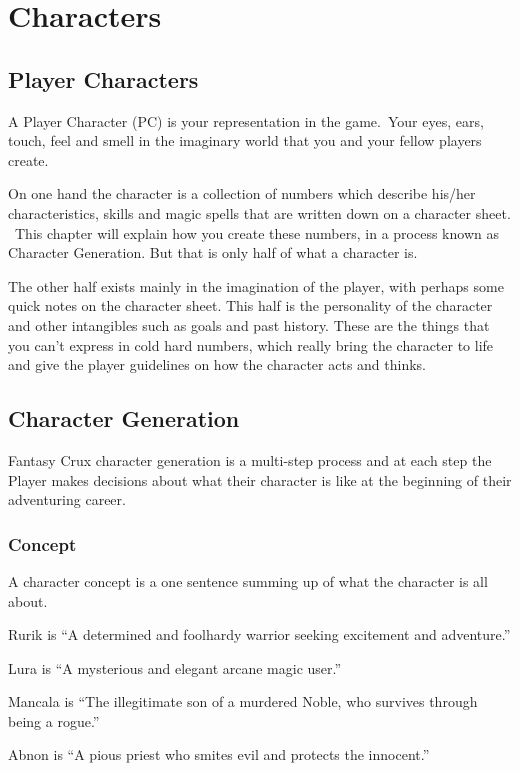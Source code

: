 \chapter{Characters}
\label{ch:characters}

\section{Player Characters}
A Player Character (PC) is your representation in the game. Your eyes, ears, touch, feel and smell in the imaginary world that you and your fellow players create.

On one hand the character is a collection of numbers which describe his/her characteristics, skills and magic spells that are written down on a character sheet.  This chapter will explain how you create these numbers, in a process known as Character Generation. But that is only half of what a character is.

The other half exists mainly in the imagination of the player, with perhaps some quick notes on the character sheet. This half is the personality of the character and other intangibles such as goals and past history. These are the things that you can’t express in cold hard numbers, which really bring the character to life and give the player guidelines on how the character acts and thinks.


\section{Character Generation}
Fantasy Crux character generation is a multi-step process and at each step the Player makes decisions about what their character is like at the beginning of their adventuring career. 

\subsection{Concept}
A character concept is a one sentence summing up of what the character is all about.

\begin{rpg-examplebox}
\begin{rpg-list}
\item Rurik is ``A determined and foolhardy warrior seeking excitement and adventure.''
\item Lura is ``A mysterious and elegant arcane magic user.''
\item Mancala is ``The illegitimate son of a murdered Noble, who survives through being a rogue.''
\item Abnon is ``A pious priest who smites evil and protects the innocent.''
\end{rpg-list}
\end{rpg-examplebox}

